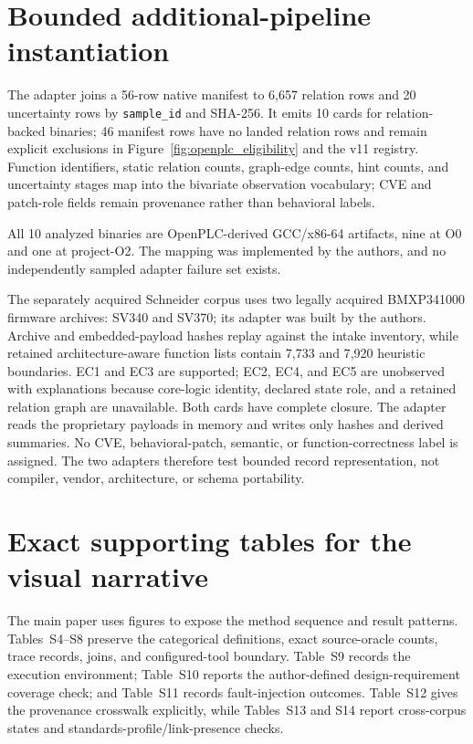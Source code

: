 \documentclass[a4paper,fleqn]{cas-dc}
\begin{document}
\section{Bounded additional-pipeline instantiation}

The adapter joins a 56-row native manifest to 6{,}657 relation rows and 20 uncertainty rows by \texttt{sample\_id} and SHA-256. It emits 10 cards for relation-backed binaries; 46 manifest rows have no landed relation rows and remain explicit exclusions in Figure~\ref{fig:openplc_eligibility} and the v11 registry. Function identifiers, static relation counts, graph-edge counts, hint counts, and uncertainty stages map into the bivariate observation vocabulary; CVE and patch-role fields remain provenance rather than behavioral labels.

All 10 analyzed binaries are OpenPLC-derived GCC/x86-64 artifacts, nine at O0 and one at project-O2. The mapping was implemented by the authors, and no independently sampled adapter failure set exists.

The separately acquired Schneider corpus uses two legally acquired BMXP341000 firmware archives: SV340 and SV370; its adapter was built by the authors. Archive and embedded-payload hashes replay against the intake inventory, while retained architecture-aware function lists contain 7{,}733 and 7{,}920 heuristic boundaries. EC1 and EC3 are supported; EC2, EC4, and EC5 are unobserved with explanations because core-logic identity, declared state role, and a retained relation graph are unavailable. Both cards have complete closure. The adapter reads the proprietary payloads in memory and writes only hashes and derived summaries. No CVE, behavioral-patch, semantic, or function-correctness label is assigned. The two adapters therefore test bounded record representation, not compiler, vendor, architecture, or schema portability.

\section{Exact supporting tables for the visual narrative}

The main paper uses figures to expose the method sequence and result patterns. Tables~S4--S8 preserve the categorical definitions, exact source-oracle counts, trace records, joins, and configured-tool boundary. Table~S9 records the execution environment; Table~S10 reports the author-defined design-requirement coverage check; and Table~S11 records fault-injection outcomes. Table~S12 gives the provenance crosswalk explicitly, while Tables~S13 and S14 report cross-corpus states and standards-profile/link-presence checks.
\end{document}
